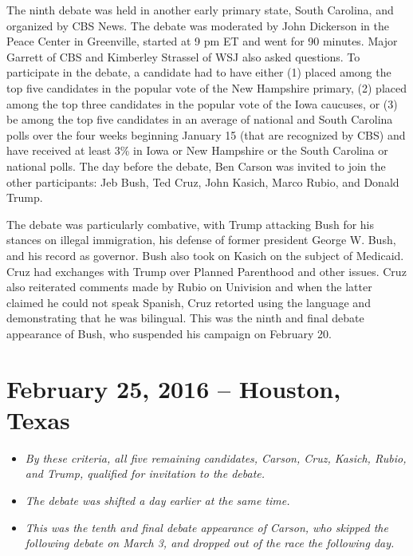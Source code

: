 The ninth debate was held in another early primary state, South
Carolina, and organized by CBS News. The debate was moderated by John
Dickerson in the Peace Center in Greenville, started at 9 pm ET and went
for 90 minutes. Major Garrett of CBS and Kimberley Strassel of WSJ also
asked questions. To participate in the debate, a candidate had to have
either (1) placed among the top five candidates in the popular vote of
the New Hampshire primary, (2) placed among the top three candidates in
the popular vote of the Iowa caucuses, or (3) be among the top five
candidates in an average of national and South Carolina polls over the
four weeks beginning January 15 (that are recognized by CBS) and have
received at least 3\% in Iowa or New Hampshire or the South Carolina or
national polls. The day before the debate, Ben Carson was invited to
join the other participants: Jeb Bush, Ted Cruz, John Kasich, Marco
Rubio, and Donald Trump.

The debate was particularly combative, with Trump attacking Bush for his
stances on illegal immigration, his defense of former president George
W. Bush, and his record as governor. Bush also took on Kasich on the
subject of Medicaid. Cruz had exchanges with Trump over Planned
Parenthood and other issues. Cruz also reiterated comments made by Rubio
on Univision and when the latter claimed he could not speak Spanish,
Cruz retorted using the language and demonstrating that he was
bilingual. This was the ninth and final debate appearance of Bush, who
suspended his campaign on February 20.

\section{February 25, 2016 -- Houston,
Texas}\label{february-25-2016-houston-texas}

\begin{itemize}
\item
  \emph{By these criteria, all five remaining candidates, Carson, Cruz,
  Kasich, Rubio, and Trump, qualified for invitation to the debate.}
\item
  \emph{The debate was shifted a day earlier at the same time.}
\item
  \emph{This was the tenth and final debate appearance of Carson, who
  skipped the following debate on March 3, and dropped out of the race
  the following day.}
\end{itemize}

